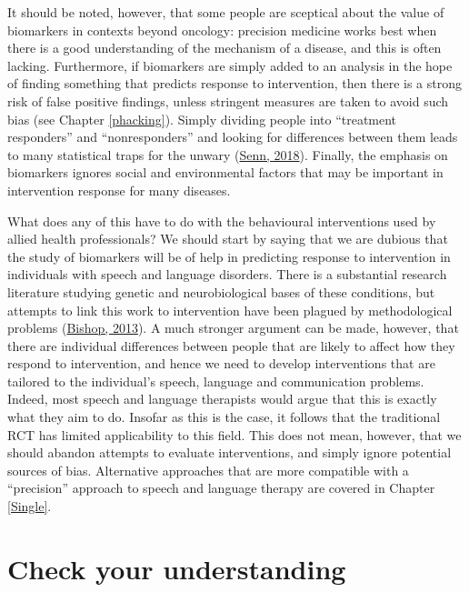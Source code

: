 \documentclass{krantz}
\begin{document}
It should be noted, however, that some people are sceptical about the value of biomarkers in contexts beyond oncology: precision medicine works best when there is a good understanding of the mechanism of a disease, and this is often lacking. Furthermore, if biomarkers are simply added to an analysis in the hope of finding something that predicts response to intervention, then there is a strong risk of false positive findings, unless stringent measures are taken to avoid such bias (see Chapter \ref{phacking}). Simply dividing people into ``treatment responders'' and ``nonresponders'' and looking for differences between them leads to many statistical traps for the unwary (\protect\hyperlink{ref-senn2018}{Senn, 2018}). Finally, the emphasis on biomarkers ignores social and environmental factors that may be important in intervention response for many diseases.

What does any of this have to do with the behavioural interventions used by allied health professionals? We should start by saying that we are dubious that the study of biomarkers will be of help in predicting response to intervention in individuals with speech and language disorders. There is a substantial research literature studying genetic and neurobiological bases of these conditions, but attempts to link this work to intervention have been plagued by methodological problems (\protect\hyperlink{ref-bishop2013a}{Bishop, 2013}). A much stronger argument can be made, however, that there are individual differences between people that are likely to affect how they respond to intervention, and hence we need to develop interventions that are tailored to the individual's speech, language and communication problems. Indeed, most speech and language therapists would argue that this is exactly what they aim to do. Insofar as this is the case, it follows that the traditional RCT has limited applicability to this field. This does not mean, however, that we should abandon attempts to evaluate interventions, and simply ignore potential sources of bias. Alternative approaches that are more compatible with a ``precision'' approach to speech and language therapy are covered in Chapter \ref{Single}.

\hypertarget{check-your-understanding-14}{%
\section{Check your understanding}\label{check-your-understanding-14}}
\end{document}

